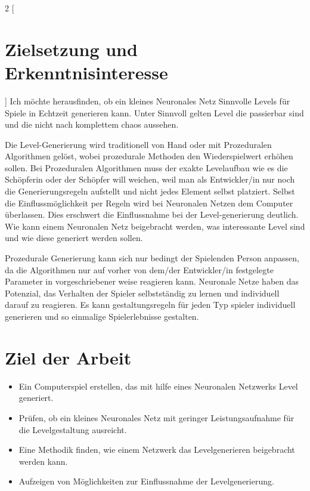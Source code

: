 \documentclass[10pt,a4paper]{article}
\begin{document}
\begin{multicols}{2}
[
\section{Zielsetzung und Erkenntnisinteresse}
]
Ich möchte herausfinden, ob ein kleines Neuronales Netz Sinnvolle Levels für Spiele in Echtzeit generieren kann. Unter Sinnvoll gelten Level die passierbar sind und die nicht nach komplettem chaos aussehen.\linebreak

Die Level-Generierung wird traditionell von Hand oder mit Prozeduralen Algorithmen gelöst, wobei prozedurale Methoden den Wiederspielwert erhöhen sollen. Bei Prozeduralen Algorithmen muss der exakte Levelaufbau wie es die Schöpferin oder der Schöpfer will weichen, weil man als Entwickler/in nur noch die Generierungsregeln aufstellt und nicht jedes Element selbst platziert. Selbst die Einflussmöglichkeit per Regeln wird bei Neuronalen Netzen dem Computer überlassen. Dies erschwert die Einflussnahme bei der Level-generierung deutlich. Wie kann einem Neuronalen Netz beigebracht werden, was interessante Level sind und wie diese generiert werden sollen.\linebreak

Prozedurale Generierung kann sich nur bedingt der Spielenden Person anpassen, da die Algorithmen nur auf vorher von dem/der Entwickler/in festgelegte Parameter in vorgeschriebener weise reagieren kann. Neuronale Netze haben das Potenzial, das Verhalten der Spieler selbstständig zu lernen und individuell darauf zu reagieren. Es kann gestaltungsregeln für jeden Typ spieler individuell generieren und so einmalige Spielerlebnisse gestalten.
\end{multicols}

\section{Ziel der Arbeit}
\begin{itemize}
\item Ein Computerspiel erstellen, das mit hilfe eines Neuronalen Netzwerks Level generiert.
\item Prüfen, ob ein kleines Neuronales Netz mit geringer Leistungsaufnahme für die Levelgestaltung ausreicht.
\item Eine Methodik finden, wie einem Netzwerk das Levelgenerieren beigebracht werden kann.
\item Aufzeigen von Möglichkeiten zur Einflussnahme der Levelgenerierung.
\end{itemize}
\end{document}
